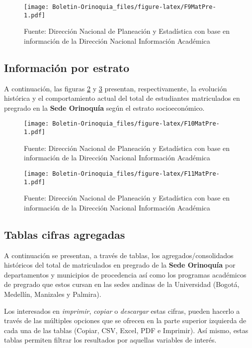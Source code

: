 \documentclass[
]{book}
\begin{document}
\begin{figure}
\centering
\texttt{[image: Boletin-Orinoquia\_files/figure-latex/F9MatPre-1.pdf]}
\caption{\label{fig:F9MatPre}Fuente: Dirección Nacional de Planeación y Estadística con base en información de la Dirección Nacional Información Académica}
\end{figure}

\hypertarget{informaciuxf3n-por-estrato}{%
\subsection{Información por estrato}\label{informaciuxf3n-por-estrato}}

A continuación, las figuras \ref{fig:F10MatPre} y \ref{fig:F11MatPre} presentan, respectivamente, la evolución histórica y el comportamiento actual del total de estudiantes matriculados en pregrado en la \textbf{Sede Orinoquía} según el estrato socioeconómico.

\begin{figure}
\centering
\texttt{[image: Boletin-Orinoquia\_files/figure-latex/F10MatPre-1.pdf]}
\caption{\label{fig:F10MatPre}Fuente: Dirección Nacional de Planeación y Estadística con base en información de la Dirección Nacional Información Académica}
\end{figure}

\begin{figure}
\centering
\texttt{[image: Boletin-Orinoquia\_files/figure-latex/F11MatPre-1.pdf]}
\caption{\label{fig:F11MatPre}Fuente: Dirección Nacional de Planeación y Estadística con base en información de la Dirección Nacional Información Académica}
\end{figure}

\hypertarget{tablas-cifras-agregadas-2}{%
\subsection{Tablas cifras agregadas}\label{tablas-cifras-agregadas-2}}

A continuación se presentan, a través de tablas, los agregados/consolidados históricos del total de matriculados en pregrado de la \textbf{Sede Orinoquía} por departamentos y municipios de procedencia así como los programas académicos de pregrado que estos cursan en las sedes andinas de la Universidad (Bogotá, Medellín, Manizales y Palmira).

Los interesados en \emph{imprimir}, \emph{copiar} o \emph{descargar} estas cifras, pueden hacerlo a través de las múltiples opciones que se ofrecen en la parte superior izquierda de cada una de las tablas (Copiar, CSV, Excel, PDF e Imprimir). Así mismo, estas tablas permiten filtrar los resultados por aquellas variables de interés.
\end{document}
